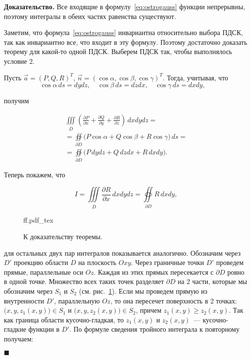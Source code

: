 \documentclass[12pt, a4paper]{article} %
\newcommand{\incfig}[1]{%
    \def\svgwidth{\columnwidth}
    {#1.pdf_tex}
}
\newcommand{\dd}[2]{\frac{\partial#1}{\partial#2}}
\renewcommand{\ge}{\geqslant}
\newenvironment{Proof}{\par\textbf{Доказательство. }}
	{\hfill$\blacksquare$\vspace{0.1cm}}
\begin{document}
\begin{Proof}
    Все входящие в формулу~\eqref{eq:ostrogauss} функции непрерывны,
    поэтому интегралы в обеих частях равенства существуют.

    Заметим, что формула~\eqref{eq:ostrogauss} инвариантна относительно
    выбора ПДСК, так как инвариантно все, что входит в эту формулу.
    Поэтому достаточно доказать теорему для какой-то одной ПДСК.
    Выберем ПДСК так, чтобы выполнялось условие 2.

    Пусть $\vec{a} = \left( P, Q, R \right)^T$, 
    $\vec{n} = (\cos \alpha, \cos \beta, \cos \gamma)^T$.
    Тогда, учитывая, что
    \begin{equation*}
        \cos \alpha\, ds = dydz, \quad
        \cos \beta\, ds = dzdx, \quad
        \cos \gamma\, ds = dxdy, \quad
    \end{equation*} 

    получим

    \begin{multline}\label{eq:ostrogauss1}\tag{1'}
        \iiint\limits_{\overline{D}} \left( 
            \dd Px + \dd Qy + \dd Rz
        \right)\, dxdydz = \\
        = \oiint\limits_{\partial D} \bigl( 
            P\cos\alpha + Q\cos\beta + R\cos\gamma
        \bigr)\, ds = \\
        = \oiint\limits_{\partial D} \bigl( 
            P\,dydz + Q\,dzdx + R\,dxdy
        \bigr)
    .\end{multline} 

    \noindent
    Теперь покажем, что

     \begin{equation*}
         I = \iiint\limits_{\overline{D}} \dd Rx \, dxdydz =
         \oiint\limits_{\partial D} R\,dxdy,
    \end{equation*} 

    \begin{figure}
        \centering
        \incfig{ff}
        \caption{К доказательству теоремы.}
        \label{fig:ff} %
    \end{figure} 

    \noindent
    для остальных двух пар интегралов показывается аналогично.
    Обозначим через $D'$ проекцию области  $D$ на плоскость  $Oxy$.
    Через граничные точки  $D'$ проведем прямые, параллельные оси  $Oz$.
    Каждая из этих прямых пересекается с  $\partial D$ ровно в одной точке.
    Множество всех таких точек разделяет $\partial D$ на 2 части,
    которые мы обозначим через  $S_1$ и  $S_2$ (см. рис.~\ref{fig:ff}).
    Если мы проведем прямую из внутренности $D'$, параллельную  $Oz$, 
    то она пересечет поверхность в 2 точках:  $\bigl( x, y, z_1(x, y) \bigr) \in S_1$ и $\bigl( x, y, z_2(x, y) \bigr) \in S_2$,
    причем $z_1(x, y) \ge z_2(x, y)$.
    Так как граница области кусочно-гладкая, то $z_1(x, y)$ и $z_2(x, y)$~---
    кусочно-гладкие функции в $D'$.
    По формуле сведения тройного интеграла к повторному получаем:


\end{Proof}
\end{document}
